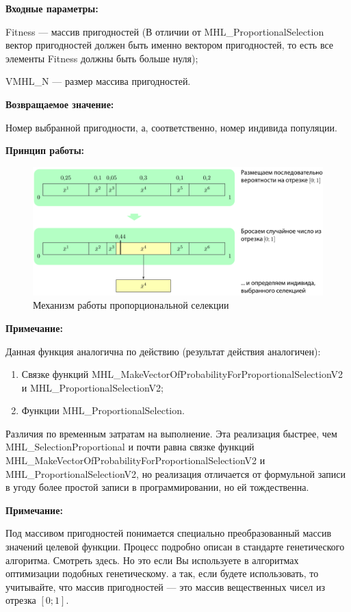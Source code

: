 \textbf{Входные параметры:}
 
  Fitness --- массив пригодностей (В отличии от MHL\_ProportionalSelection вектор пригодностей должен быть именно вектором пригодностей, то есть все элементы Fitness должны быть больше нуля);
  
 VMHL\_N --- размер массива пригодностей.

\textbf{Возвращаемое значение:} 

Номер выбранной пригодности, а, соответственно, номер индивида популяции.

 \textbf{Принцип работы:}

\begin{figure} [h]
  \center
  \includegraphics [scale=0.8] {MHL_ProportionalSelection_Sheme}
  \caption{Механизм работы пропорциональной селекции} 
  \label{img:MHL_ProportionalSelection_Sheme}  
\end{figure}

\textbf{Примечание:}

Данная функция аналогична по действию (результат действия аналогичен):
 
 \begin{enumerate}
\item Связке функций MHL\_MakeVectorOfProbabilityForProportionalSelectionV2 и MHL\_ProportionalSelectionV2;
\item Функции MHL\_ProportionalSelection.
 \end{enumerate}
 
 Различия по временным затратам на выполнение. Эта реализация быстрее, чем MHL\_SelectionProportional
 и почти равна связке функций MHL\_MakeVectorOfProbabilityForProportionalSelectionV2 и MHL\_ProportionalSelectionV2,
 но реализация отличается от формульной записи в угоду более простой записи в программировании, но ей тождественна.
  
\textbf{Примечание:}

Под массивом пригодностей понимается специально преобразованный массив значений целевой функции. Процесс подробно описан в стандарте генетического алгоритма. Смотреть здесь. Но это если Вы используете в алгоритмах оптимизации подобных генетическому. а так, если будете использовать, то учитывайте, что массив пригодностей --- это массив вещественных чисел из отрезка $[0;1]$.

